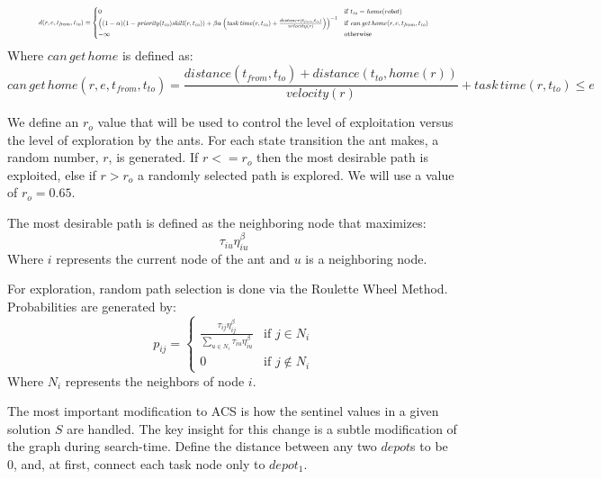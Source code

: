 \documentclass[a4paper]{article}
\begin{document}
\begin{equation*}
\resizebox{0.9\textwidth}{!}{$
\mathit{d}(r, e, t_\mathit{from}, t_\mathit{to}) = \begin{cases}
  0 & \text{if } t_\mathit{to} = \mathit{home}(robot) \\
  \left(
  (1 - \alpha)
    (1 - \mathit{priority}(t_\mathit{to}) \mathit{skill}(r, t_\mathit{to})) +
    \beta \alpha
    \left(
      \mathit{task \, time}(r, t_\mathit{to}) +
      \frac{ distance(t_\mathit{from}, t_\mathit{to}) } {velocity(r)}
    \right)
  \right)^{-1}
  & \text{if }\mathit{can \, get \, home}(r, e, t_\mathit{from}, t_\mathit{to}) \\
  - \infty
  & \text{otherwise} \\
\end{cases}
$}
\end{equation*}
Where $\mathit{can \, get \, home}$ is defined as:
$$
\mathit{can \, get \, home}(r, e, t_\mathit{from}, t_\mathit{to}) =
\frac{\mathit{distance}(t_\mathit{from}, t_\mathit{to}) + \mathit{distance}(t_\mathit{to}, \mathit{home}(r))}{velocity(r)} + \mathit{task \, time}(r, t_\mathit{to}) \leq e
$$

We define an $r_o$ value that will be used to control the level of exploitation versus the level of exploration by the ants.
For each state transition the ant makes, a random number, $r$, is generated.
If $r<=r_o$ then the most desirable path is exploited, else if $r>r_o$
a randomly selected path is explored. We will use a value of $r_o=0.65$.

The most desirable path is defined as the neighboring node that maximizes:
$$
\tau_{iu}\eta_{iu}^\beta
$$
Where $i$ represents the current node of the ant and $u$ is a neighboring node.

For exploration, random path selection is done via the Roulette Wheel Method.
Probabilities are generated by:
$$
p_{ij}=
\begin{cases}
\frac{\tau_{ij}\eta_{ij}^\beta}{\sum\limits_{u\in N_i} \tau_{iu}\eta_{iu}^\beta} & \text{if } j \in N_i\\
0 & \text{if } j \not\in N_i
\end{cases}
$$
Where $N_i$ represents the neighbors of node $i$.

The most important modification to ACS is how the sentinel values in a given solution $S$ are handled.
The key insight for this change is a subtle modification of the graph during search-time. Define the distance between any
two $depot$s to be 0, and, at first, connect each task node only to $depot_1$.
\end{document}
